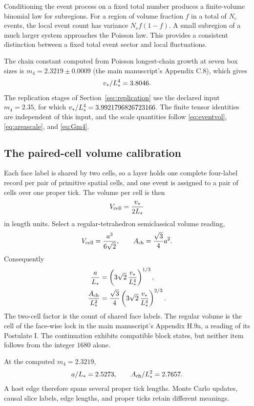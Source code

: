 Conditioning the event process on a fixed total number produces a finite-volume binomial law for subregions. For a region of volume fraction $f$ in a total of $N_e$ events, the local event count has variance $N_ef(1-f)$. A small subregion of a much larger system approaches the Poisson law. This provides a consistent distinction between a fixed total event sector and local fluctuations.

The chain constant computed from Poisson longest-chain growth at seven box sizes is $m_4=2.3219\pm0.0009$ (the main manuscript's Appendix C.8), which gives
\begin{equation}
v_*/L_*^4=3.8046.
\end{equation}
The replication stages of Section~\ref{sec:replication} use the declared input $m_4=2.35$, for which $v_*/L_*^4=3.9921796826723166$. The finite tensor identities are independent of this input, and the scale quantities follow \eqref{eq:eventvol}, \eqref{eq:areascale}, and \eqref{eq:Gm4}.

\subsection{The paired-cell volume calibration}

Each face label is shared by two cells, so a layer holds one complete four-label record per pair of primitive spatial cells, and one event is assigned to a pair of cells over one proper tick. The volume per cell is then
\begin{equation}
V_{\rm cell}=\frac{v_*}{2L_*}
\end{equation}
in length units. Select a regular-tetrahedron semiclassical volume reading,
\begin{equation}
V_{\rm cell}=\frac{a^3}{6\sqrt2},\qquad
A_{\rm ch}=\frac{\sqrt3}{4}a^2.
\end{equation}
Consequently
\begin{align}
\frac{a}{L_*}
&=\left(3\sqrt2\,\frac{v_*}{L_*^4}\right)^{1/3},\\
\frac{A_{\rm ch}}{L_*^2}
&=\frac{\sqrt3}{4}
\left(3\sqrt2\,\frac{v_*}{L_*^4}\right)^{2/3}.
\label{eq:areascale}
\end{align}
The two-cell factor is the count of shared face labels. The regular volume is the cell of the face-wise lock in the main manuscript's Appendix H.9a, a reading of its Postulate I. The continuation exhibits compatible block states, but neither item follows from the integer $1680$ alone.

At the computed $m_4=2.3219$,
\begin{equation}
a/L_*=2.5273,\qquad
A_{\rm ch}/L_*^2=2.7657.
\end{equation}
A host edge therefore spans several proper tick lengths. Monte Carlo updates, causal slice labels, edge lengths, and proper ticks retain different meanings.

